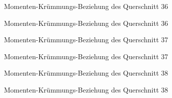 \documentclass[
  11pt,
  letterpaper,
]{scrreprt}
\begin{document}
\begin{figure}[H]


\caption{\label{fig-qs_36}Momenten-Krümmungs-Beziehung des Querschnitt
36}

\end{figure}%

\begin{figure}[H]


\caption{\label{fig-m_chi_36}Momenten-Krümmungs-Beziehung des
Querschnitt 36}

\end{figure}%

\begin{figure}[H]


\caption{\label{fig-qs_37}Momenten-Krümmungs-Beziehung des Querschnitt
37}

\end{figure}%

\begin{figure}[H]


\caption{\label{fig-m_chi_37}Momenten-Krümmungs-Beziehung des
Querschnitt 37}

\end{figure}%

\begin{figure}[H]


\caption{\label{fig-qs_38}Momenten-Krümmungs-Beziehung des Querschnitt
38}

\end{figure}%

\begin{figure}[H]


\caption{\label{fig-m_chi_38}Momenten-Krümmungs-Beziehung des
Querschnitt 38}

\end{figure}%
\end{document}
